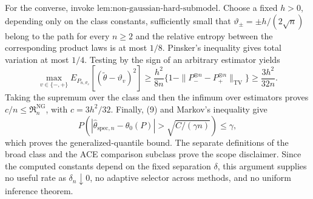 For the converse, invoke \(\text{lem:non-gaussian-hard-submodel}\). Choose a fixed \(h>0\), depending only on the class constants, sufficiently small that \(\vartheta_{\pm}=\pm h/(2\sqrt n)\) belong to the path for every \(n\ge2\) and the relative entropy between the corresponding product laws is at most \(1/8\). Pinsker's inequality gives total variation at most \(1/4\). Testing by the sign of an arbitrary estimator yields
\[
 \max_{v\in\{-,+\}}E_{P_{n,\vartheta_v}}
 [ (\widetilde\theta-\vartheta_v)^2]
 \ge\frac{h^2}{8n}
 \{1-\|P_-^{\otimes n}-P_+^{\otimes n}\|_{\mathrm{TV}}\}
 \ge\frac{3h^2}{32n}.
\]
Taking the supremum over the class and then the infimum over estimators proves \(c/n\le\mathfrak R_n^{\mathrm{NG}}\), with \(c=3h^2/32\). Finally, (9) and Markov's inequality give
\[
 P\!\left(|\widehat\theta_{\mathrm{spec},n}-\theta_0(P)|>
 \sqrt{C/(\gamma n)}\right)\le\gamma,
\]
which proves the generalized-quantile bound. The separate definitions of the broad class and the ACE comparison subclass prove the scope disclaimer. Since the computed constants depend on the fixed separation \(\delta\), this argument supplies no useful rate as \(\delta_n\downarrow0\), no adaptive selector across methods, and no uniform inference theorem.